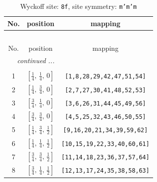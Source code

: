 \documentclass[fleqn,8pt]{jsarticle}
\begin{document}
\begin{longtable}{ccc}
\caption{Wyckoff site: {\tt 8f}, site symmetry: {\tt m'm'm}}
 \\
 \hline \hline
No. & position & mapping \\ \hline \endfirsthead

\multicolumn{2}{l}{\tablename\ \thetable{}} \\
 \hline \hline
No. & position & mapping \\ \hline \endhead

 \hline \hline
\multicolumn{2}{r}{\footnotesize\it continued ...} \\ \endfoot

 \hline \hline
\multicolumn{2}{r}{} \\ \endlastfoot

1 & $\left[ \frac{1}{4},\, \frac{1}{4},\, 0 \right]$ & {\tt [1,8,28,29,42,47,51,54]} \\ \hline
2 & $\left[ \frac{1}{4},\, \frac{3}{4},\, 0 \right]$ & {\tt [2,7,27,30,41,48,52,53]} \\ \hline
3 & $\left[ \frac{3}{4},\, \frac{1}{4},\, 0 \right]$ & {\tt [3,6,26,31,44,45,49,56]} \\ \hline
4 & $\left[ \frac{3}{4},\, \frac{3}{4},\, 0 \right]$ & {\tt [4,5,25,32,43,46,50,55]} \\ \hline
5 & $\left[ \frac{1}{4},\, \frac{3}{4},\, \frac{1}{2} \right]$ & {\tt [9,16,20,21,34,39,59,62]} \\ \hline
6 & $\left[ \frac{1}{4},\, \frac{1}{4},\, \frac{1}{2} \right]$ & {\tt [10,15,19,22,33,40,60,61]} \\ \hline
7 & $\left[ \frac{3}{4},\, \frac{3}{4},\, \frac{1}{2} \right]$ & {\tt [11,14,18,23,36,37,57,64]} \\ \hline
8 & $\left[ \frac{3}{4},\, \frac{1}{4},\, \frac{1}{2} \right]$ & {\tt [12,13,17,24,35,38,58,63]} \\
\end{longtable}
\renewcommand{\arraystretch}{1.2}
\end{document}
